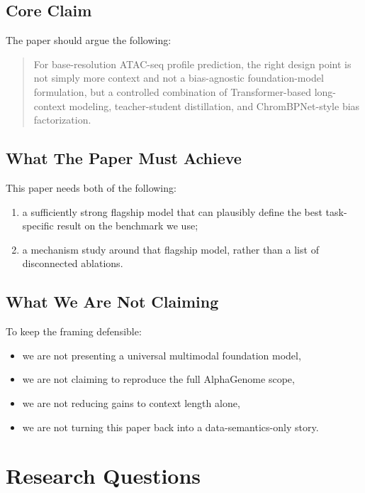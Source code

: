 \documentclass[11pt]{article}
\begin{document}
\subsection{Core Claim}
The paper should argue the following:
\begin{quote}
For base-resolution ATAC-seq profile prediction, the right design point is not
simply more context and not a bias-agnostic foundation-model formulation, but a
controlled combination of Transformer-based long-context modeling,
teacher-student distillation, and ChromBPNet-style bias factorization.
\end{quote}

\subsection{What The Paper Must Achieve}
This paper needs both of the following:
\begin{enumerate}[leftmargin=2em]
  \item a sufficiently strong flagship model that can plausibly define the best
  task-specific result on the benchmark we use;
  \item a mechanism study around that flagship model, rather than a list of
  disconnected ablations.
\end{enumerate}

\subsection{What We Are Not Claiming}
To keep the framing defensible:
\begin{itemize}[leftmargin=2em]
  \item we are not presenting a universal multimodal foundation model,
  \item we are not claiming to reproduce the full AlphaGenome scope,
  \item we are not reducing gains to context length alone,
  \item we are not turning this paper back into a data-semantics-only story.
\end{itemize}

\section{Research Questions}
\end{document}
